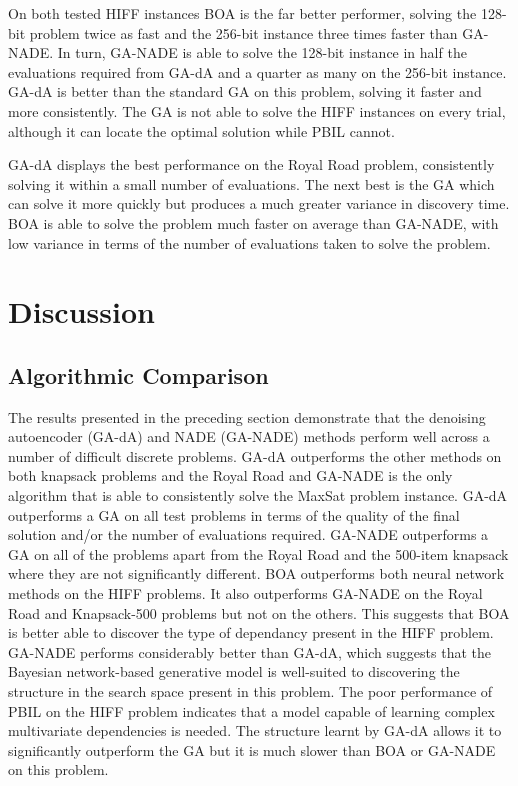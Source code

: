 \documentclass[twoside]{article}
\begin{document}
On both tested HIFF instances BOA is the far better performer, solving the 128-bit problem twice as fast and the 256-bit instance three times faster than GA-NADE. In turn, GA-NADE is able to solve the 128-bit instance in half the evaluations required from GA-dA and a quarter as many on the 256-bit instance. GA-dA is better than the standard GA on this problem, solving it faster and more consistently. The GA is not able to solve the HIFF instances on every trial, although it can locate the optimal solution while PBIL cannot.

GA-dA displays the best performance on the Royal Road problem, consistently solving it within a small number of evaluations. The next best is the GA which can solve it more quickly but produces a much greater variance in discovery time. BOA is able to solve the problem much faster on average than GA-NADE, with low variance in terms of the number of evaluations taken to solve the problem.

\section{Discussion}

\subsection{Algorithmic Comparison}
The results presented in the preceding section demonstrate that the denoising autoencoder (GA-dA) and NADE (GA-NADE) methods perform well across a number of difficult discrete problems. GA-dA outperforms the other methods on both knapsack problems and the Royal Road and GA-NADE is the only algorithm that is able to consistently solve the MaxSat problem instance. GA-dA outperforms a GA on all test problems in terms of the quality of the final solution and/or the number of evaluations required. GA-NADE outperforms a GA on all of the problems apart from the Royal Road and the 500-item knapsack where they are not significantly different. BOA outperforms both neural network methods on the HIFF problems. It also outperforms GA-NADE on the Royal Road and Knapsack-500 problems but not on the others. This suggests that BOA is better able to discover the type of dependancy present in the HIFF problem. GA-NADE performs considerably better than GA-dA, which suggests that the Bayesian network-based generative model is well-suited to discovering the structure in the search space present in this problem. The poor performance of PBIL on the HIFF problem indicates that a model capable of learning complex multivariate dependencies is needed. The structure learnt by GA-dA allows it to significantly outperform the GA but it is much slower than BOA or GA-NADE on this problem. 
\end{document}
